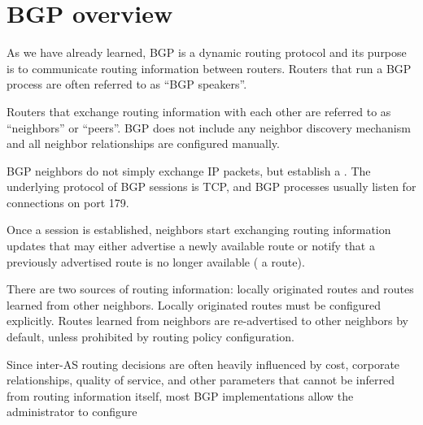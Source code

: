 \chapter{BGP overview}

As we have already learned, BGP is a dynamic routing protocol and its purpose
is to communicate routing information between routers. Routers that run a BGP process
are often referred to as ``BGP speakers''.

Routers that exchange routing information with each other are referred to as ``neighbors''
or ``peers''. BGP does not include any neighbor discovery mechanism and all neighbor relationships
are configured manually. 

BGP neighbors do not simply exchange IP packets, but establish a .
The underlying protocol of BGP sessions is TCP, and BGP processes usually listen
for connections on port 179\cite{rfc4271}.

Once a session is established, neighbors start exchanging routing information updates
that may either advertise a newly available route or notify that a previously advertised
route is no longer available ( a route).

There are two sources of routing information: locally originated routes and routes learned
from other neighbors. Locally originated routes must be configured explicitly. Routes learned
from neighbors are re-advertised to other neighbors by default, unless prohibited by 
routing policy configuration.

Since inter-AS routing decisions are often heavily influenced by cost, corporate relationships,
quality of service, and other parameters that cannot be inferred from routing information itself,
most BGP implementations allow the administrator to configure 
